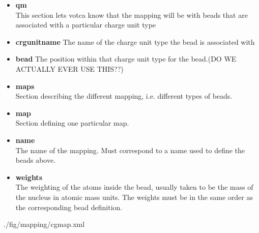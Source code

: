 \begin{itemize}
\item {\bf qm} \\
 This section lets votca know that the mapping will be with beads that are associated with a particular charge unit type
 \item {\bf crgunitname}
 The name of the charge unit type the bead is associated with
 \item {\bf bead}
 The position within that charge unit type for the bead.(DO WE ACTUALLY EVER USE THIS??) 
 \item {\bf maps} \\
 Section describing the different mapping, i.e. different types of beads.
 \item {\bf map} \\
 Section defining one particular map.
 \item {\bf name} \\
 The name of the mapping. Must correspond to a name used to define the beads above.
 \item {\bf weights} \\
 The weighting of the atoms inside the bead, usually taken to be the mass of the nucleus in atomic mass units. The weights must be in the same order as the corresponding bead definition.
\end{itemize}


\clearpage




%
{./fig/mapping/cgmap.xml}

